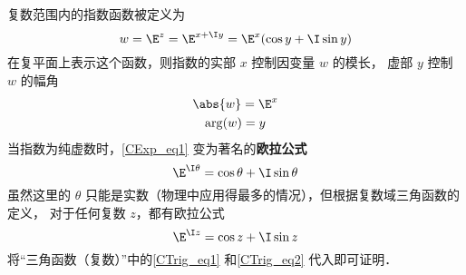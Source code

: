 

复数范围内的指数函数被定义为
 \begin{equation}\label{CExp_eq1}
w = {\E^z} = {\E^{x + \I y}} = {\E^x}(\cos y + \I\sin y)
\end{equation}
在复平面上表示这个函数，则指数的实部 $x$ 控制因变量 $w$ 的模长， 虚部 $y$ 控制 $w$ 的幅角
 \begin{gather}
\abs{w} = {\E^x} \\
\arg(w) = y
\end{gather}
当指数为纯虚数时，\autoref{CExp_eq1} 变为著名的\textbf{欧拉公式}
\begin{equation}\label{CExp_eq2}
{\E^{\I \theta}} = {\cos \theta + \I\sin \theta}
\end{equation}
虽然这里的 $\theta$ 只能是实数（物理中应用得最多的情况），但根据复数域三角函数的定义， 对于任何复数 $z$，都有欧拉公式
\begin{equation}
{\E^{\I z}} = {\cos z + \I\sin z}
\end{equation}
将“三角函数（复数）”中的\autoref{CTrig_eq1} 和\autoref{CTrig_eq2} 代入即可证明．